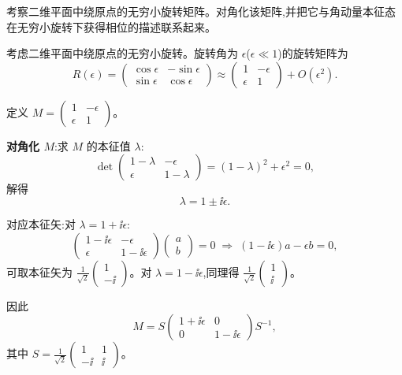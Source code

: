 \begin{question}
考察二维平面中绕原点的无穷小旋转矩阵。对角化该矩阵,并把它与角动量本征态在无穷小旋转下获得相位的描述联系起来。
\end{question}
\begin{solution}
	考虑二维平面中绕原点的无穷小旋转。旋转角为 $\epsilon$($\epsilon\ll1$)的旋转矩阵为
	\[
	R(\epsilon)=\begin{pmatrix}\cos\epsilon&-\sin\epsilon\\ \sin\epsilon&\cos\epsilon\end{pmatrix}
	\approx\begin{pmatrix}1&-\epsilon\\ \epsilon&1\end{pmatrix}+O(\epsilon^2).
	\]

	定义 $M=\begin{pmatrix}1&-\epsilon\\ \epsilon&1\end{pmatrix}$。

	\textbf{对角化 $M$}:求 $M$ 的本征值 $\lambda$:
	\[
	\det\begin{pmatrix}1-\lambda&-\epsilon\\ \epsilon&1-\lambda\end{pmatrix}
	=(1-\lambda)^2+\epsilon^2=0,
	\]
	解得
	\[
	\lambda = 1\pm \ii\epsilon.
	\]

	对应本征矢:对 $\lambda=1+\ii\epsilon$:
	\[
	\begin{pmatrix}1-\ii\epsilon&-\epsilon\\ \epsilon&1-\ii\epsilon\end{pmatrix}\begin{pmatrix}a\\b\end{pmatrix}=0
	\;\Longrightarrow\; (1-\ii\epsilon)a-\epsilon b=0,
	\]
	可取本征矢为 $\frac{1}{\sqrt{2}}\begin{pmatrix}1\\ -\ii\end{pmatrix}$。对 $\lambda=1-\ii\epsilon$,同理得 $\frac{1}{\sqrt{2}}\begin{pmatrix}1\\ \ii\end{pmatrix}$。

	因此
	\[
	M = S\begin{pmatrix}1+\ii\epsilon&0\\0&1-\ii\epsilon\end{pmatrix}S^{-1},
	\]
	其中 $S=\frac{1}{\sqrt{2}}\begin{pmatrix}1&1\\ -\ii&\ii\end{pmatrix}$。


\end{solution}
